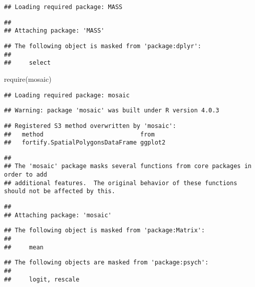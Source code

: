 \documentclass[
]{book}
\newenvironment{Shaded}{\begin{snugshade}}{\end{snugshade}}
\newcommand{\FunctionTok}[1]{\textcolor[rgb]{0.00,0.00,0.00}{#1}}
\newcommand{\NormalTok}[1]{#1}
\begin{document}
\begin{verbatim}
## Loading required package: MASS
\end{verbatim}

\begin{verbatim}
## 
## Attaching package: 'MASS'
\end{verbatim}

\begin{verbatim}
## The following object is masked from 'package:dplyr':
## 
##     select
\end{verbatim}

\begin{Shaded}
\begin{Highlighting}[]
\FunctionTok{require}\NormalTok{(mosaic)}
\end{Highlighting}
\end{Shaded}

\begin{verbatim}
## Loading required package: mosaic
\end{verbatim}

\begin{verbatim}
## Warning: package 'mosaic' was built under R version 4.0.3
\end{verbatim}

\begin{verbatim}
## Registered S3 method overwritten by 'mosaic':
##   method                           from   
##   fortify.SpatialPolygonsDataFrame ggplot2
\end{verbatim}

\begin{verbatim}
## 
## The 'mosaic' package masks several functions from core packages in order to add 
## additional features.  The original behavior of these functions should not be affected by this.
\end{verbatim}

\begin{verbatim}
## 
## Attaching package: 'mosaic'
\end{verbatim}

\begin{verbatim}
## The following object is masked from 'package:Matrix':
## 
##     mean
\end{verbatim}

\begin{verbatim}
## The following objects are masked from 'package:psych':
## 
##     logit, rescale
\end{verbatim}
\end{document}
